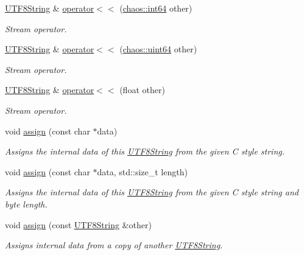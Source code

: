 \begin{DoxyCompactItemize}
\hyperlink{classchaos_1_1uni_1_1_u_t_f8_string}{U\-T\-F8\-String} \& \hyperlink{classchaos_1_1uni_1_1_u_t_f8_string_a7b148a90a57870cf12735e3722992ac0}{operator$<$$<$} (\hyperlink{namespacechaos_aa4cfe70894188e01134a2694db2eb2db}{chaos\-::int64} other)
\begin{DoxyCompactList}\small\item\em Stream operator. \end{DoxyCompactList}\item 
\hyperlink{classchaos_1_1uni_1_1_u_t_f8_string}{U\-T\-F8\-String} \& \hyperlink{classchaos_1_1uni_1_1_u_t_f8_string_a45b9f65068486d6399c5bf9b88fbb021}{operator$<$$<$} (\hyperlink{namespacechaos_a9d62ad11fed4e3a5af70653b228ac910}{chaos\-::uint64} other)
\begin{DoxyCompactList}\small\item\em Stream operator. \end{DoxyCompactList}\item 
\hyperlink{classchaos_1_1uni_1_1_u_t_f8_string}{U\-T\-F8\-String} \& \hyperlink{classchaos_1_1uni_1_1_u_t_f8_string_a0c7dc55985240cfd0f0d96f6f2007c5a}{operator$<$$<$} (float other)
\begin{DoxyCompactList}\small\item\em Stream operator. \end{DoxyCompactList}\item 
void \hyperlink{classchaos_1_1uni_1_1_u_t_f8_string_a87d1da629dd2a2071515e971fd5edffc}{assign} (const char $\ast$data)
\begin{DoxyCompactList}\small\item\em Assigns the internal data of this \hyperlink{classchaos_1_1uni_1_1_u_t_f8_string}{U\-T\-F8\-String} from the given C style string. \end{DoxyCompactList}\item 
void \hyperlink{classchaos_1_1uni_1_1_u_t_f8_string_a5c20ffede72bda70e6743de39aae7128}{assign} (const char $\ast$data, std\-::size\-\_\-t length)
\begin{DoxyCompactList}\small\item\em Assigns the internal data of this \hyperlink{classchaos_1_1uni_1_1_u_t_f8_string}{U\-T\-F8\-String} from the given C style string and byte length. \end{DoxyCompactList}\item 
void \hyperlink{classchaos_1_1uni_1_1_u_t_f8_string_af3e2f751444401ab7b5bc4c07b29de63}{assign} (const \hyperlink{classchaos_1_1uni_1_1_u_t_f8_string}{U\-T\-F8\-String} \&other)
\begin{DoxyCompactList}\small\item\em Assigns internal data from a copy of another \hyperlink{classchaos_1_1uni_1_1_u_t_f8_string}{U\-T\-F8\-String}. \end{DoxyCompactList}\item 

\end{DoxyCompactItemize}
